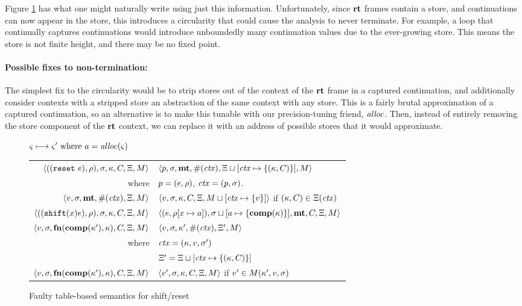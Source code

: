 \documentclass{llncs}
\begin{document}
Figure \ref{fig:shift-reset-table0} has what one might naturally write
using just this information. Unfortunately, since $\mathbf{rt}$ frames contain
a store, and continuations can now appear in the store, this
introduces a circularity that could cause the analysis to never
terminate. For example, a loop that continually captures continuations
would introduce unboundedly many continuation values due to the
ever-growing store. This means the store is not finite height, and
there may be no fixed point.

\paragraph{Possible fixes to non-termination:} The simplest fix to the
circularity would be to strip stores out of the context of the $\mathbf{rt}$
frame in a captured continuation, and additionally consider contexts
with a stripped store an abstraction of the same context with any
store. This is a fairly brutal approximation of a captured
continuation, so an alternative is to make this tunable with our
precision-tuning friend, $\mathit{alloc}$. Then, instead of entirely removing
the store component of the $\mathbf{rt}$ context, we can replace it with an
address of possible stores that it would approximate.

\begin{figure}
  \centering
  $\varsigma \longmapsto \varsigma' \text{ where } a = \mathit{alloc}(\varsigma)$ \\
  \begin{tabular}{r|l}
    \hline
    $\langle ((\texttt{reset}\ e), \rho), \sigma, \kappa, C, \Xi, M \rangle$
    &
    $\langle p, \sigma, \mathbf{mt}, \#(\mathit{ctx}), \Xi\sqcup[\mathit{ctx} \mapsto \{ (\kappa,C) \}], M \rangle$
    \\
    where & $p = (e, \rho)$, $\mathit{ctx} = (p, \sigma)$.
    \\
    $\langle v, \sigma, \mathbf{mt}, \#(\mathit{ctx}), \Xi, M \rangle$
    &
    $\langle v, \sigma, {\kappa}, {C}, \Xi, M\sqcup[\mathit{ctx} \mapsto \{ v \}] \rangle$
    if $(\kappa,C) \in \Xi(\mathit{ctx})$
    \\
    $\langle ((\texttt{shift} (x) e), \rho), \sigma, \kappa, C, \Xi, M \rangle$
    &
    $\langle (e, \rho[x \mapsto a]), \sigma\sqcup[a \mapsto \{ \mathbf{comp}(\kappa) \}],\mathbf{mt},C,\Xi,M \rangle$
    \\
    $\langle v,\sigma,\mathbf{fn}{}(\mathbf{comp}(\kappa'), \kappa), C, \Xi, M \rangle$
    &
    $\langle v, \sigma, \kappa', \#(\mathit{ctx}), \Xi',M \rangle$
    \\
    where & $\mathit{ctx} = (\kappa, v, \sigma')$ \\
          & $\Xi' = \Xi\sqcup[\mathit{ctx} \mapsto \{ (\kappa,C) \}]$
    \\
    $\langle v,\sigma,\mathbf{fn}{}(\mathbf{comp}(\kappa'), \kappa), C, \Xi, M \rangle$
    &
    $\langle v', \sigma, \kappa, C, \Xi,M \rangle$ if $v' \in M(\kappa',v,\sigma)$
  \end{tabular}  
  \caption{Faulty table-based semantics for shift/reset}
  \label{fig:shift-reset-table0}
\end{figure}
\end{document}
